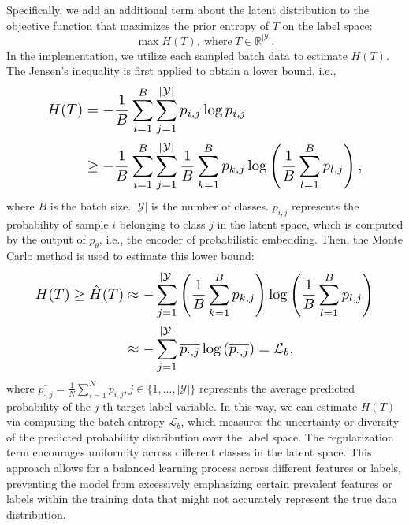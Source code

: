 \documentclass[letterpaper]{article} %
\begin{document}
Specifically, we add an additional term about the latent distribution to the objective function that maximizes the prior entropy of $T$ on the label space:
\begin{equation}
\max H(T), \ \text{where} \ T\in\mathbb{R}^{|\mathcal{Y}|}.
\end{equation}
In the implementation, we utilize each sampled batch data to estimate $H(T)$. The Jensen's inequality is first applied to obtain a lower bound, i.e.,
\begin{equation}
\resizebox{0.83\linewidth}{!}{$
\begin{split}
H(T) &= -\frac{1}{B}\sum_{i=1}^{B}\sum_{j=1}^{|\mathcal{Y}|}p_{i,j} \log p_{i,j} \\
&\geq-\frac{1}{B}\sum_{i=1}^{B}\sum_{j=1}^{|\mathcal{Y}|}\frac{1}{B}\sum_{k=1}^{B}p_{k,j} \log \left(\frac{1}{B}\sum_{l=1}^{B}p_{l,j}\right), \\
\end{split}
$}
\end{equation}
where $B$ is the batch size. $|\mathcal{Y}|$ is the number of classes. $p_{i,j}$ represents the probability of sample $i$ belonging to class $j$ in the latent space, which is computed by the output of $p_{\theta}$, i.e., the encoder of probabilistic embedding.
Then, the Monte Carlo method is used to estimate this lower bound:
\begin{equation}
\resizebox{0.89\linewidth}{!}{$
    \begin{split}
H(T) \geq \hat{H}(T) & \approx - \sum_{j=1}^{|\mathcal{Y}|} \left ( \frac { 1 } { B } \sum _ { k=1 } ^ { B } p_ { k,j } \right ) \log \left ( \frac { 1 } { B } \sum _ { l=1 } ^ { B } p_ { l,j } \right ) \\
   & \approx - \sum_{j=1}^{|\mathcal { Y } | } \overline { p_ { \cdot ,j } } \log \left ( \overline { p_ { \cdot ,j } } \right ) = \mathcal{L}_b,
    \end{split}
    $}
\end{equation}
where $\overline{p_{\cdot,j}} = \frac{1}{N}\sum_{i=1}^{N} p_{i,j}, j \in \{1,...,|\mathcal{Y}|\}$ represents the average predicted probability of the $j$-th target label variable.
In this way, we can estimate $H(T)$ via computing the batch entropy $\mathcal{L}_b$, which measures the uncertainty or diversity of the predicted probability distribution over the label space.
The regularization term encourages uniformity across different classes in the latent space.
This approach allows for a balanced learning process across different features or labels, preventing the model from excessively emphasizing certain prevalent features or labels within the training data that might not accurately represent the true data distribution.
\end{document}
